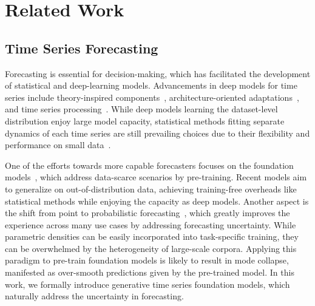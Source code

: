 \section{Related Work}
\subsection{Time Series Forecasting}
Forecasting is essential for decision-making, which has facilitated the development of statistical and deep-learning models. Advancements in deep models for time series include theory-inspired components~\cite{wu2021autoformer, zeng2023transformers, wu2022timesnet}, architecture-oriented adaptations~\cite{bai2018empirical, salinas2020deepar, lim2021temporal}, and time series processing~\cite{kim2021reversible, nie2022time}. While deep models learning the dataset-level distribution enjoy large model capacity, statistical methods fitting separate dynamics of each time series are still prevailing choices due to their flexibility and performance on small data~\cite{ke2017lightgbm, hyndman2018forecasting}.

One of the efforts towards more capable forecasters focuses on the foundation models~\cite{bommasani2021opportunities}, which address data-scarce scenarios by pre-training. Recent models aim to generalize on out-of-distribution data, achieving training-free overheads like statistical methods while enjoying the capacity as deep models. Another aspect is the shift from point to probabilistic forecasting~\cite{woo2024unified, ansari2024chronos}, which greatly improves the experience across many use cases by addressing forecasting uncertainty. While parametric densities can be easily incorporated into task-specific training, they can be overwhelmed by the heterogeneity of large-scale corpora. Applying this paradigm to pre-train foundation models is likely to result in mode collapse, manifested as over-smooth predictions given by the pre-trained model. In this work, we formally introduce generative time series foundation models, which naturally address the uncertainty in forecasting.

